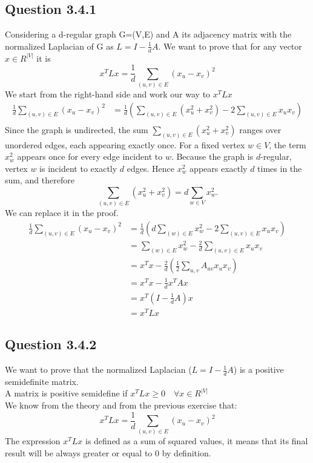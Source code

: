 \documentclass[a4paper]{scrartcl}
\begin{document}
\subsection*{Question 3.4.1}
Considering a d-regular graph G=(V,E) and A its adjacency matrix with the normalized Laplacian of G as $L=I-\frac{1}{d}A$. We want to prove that for any vector $x \in R^{|V|}$ it is
\[ 
x^T L x = \frac{1}{d}\sum_{(u,v)\in E} (x_u - x_v)^2
\]
We start from the right-hand side and work our way to $x^T L x$
\begin{align*}
  \frac{1}{d}\sum_{(u,v)\in E} (x_u - x_v)^2 &= \frac{1}{d} \left( \sum_{(u,v)\in E} \left(x_u^2 + x_v^2\right) - 2\sum_{(u,v)\in E} x_u x_v \right)\\
\end{align*}
Since the graph is undirected, the sum $\sum_{(u,v)\in E} \left(x_u^2 + x_v^2\right)$ ranges over unordered edges, each appearing exactly once.
For a fixed vertex $w\in V$, the term $x_w^2$ appears once for every edge incident to $w$.
Because the graph is $d$-regular, vertex $w$ is incident to exactly $d$ edges.
Hence $x_w^2$ appears exactly $d$ times in the sum, and therefore
\[
\sum_{(u,v)\in E} (x_u^2 + x_v^2)
= d \sum_{w\in V} x_w^2.
\]
We can replace it in the proof.
\begin{align*}
  \frac{1}{d}\sum_{(u,v)\in E} (x_u - x_v)^2 &= \frac{1}{d} \left( d\sum_{(w)\in E} x_w^2 - 2\sum_{(u,v)\in E} x_u x_v \right)\\
  &= \sum_{(w)\in E} x_w^2 - \frac{2}{d}\sum_{(u,v)\in E} x_u x_v\\
  &= x^T x - \frac{2}{d} \left(\frac{1}{2} \sum_{u,v} A_{uv} x_u x_v\right)\\
  &= x^T x - \frac{1}{d} x^T A x\\
  &= x^T \left(I -\frac{1}{d} A \right)x\\
  &= x^T L x
\end{align*}

\subsection*{Question 3.4.2}
We want to prove that the normalized Laplacian ($L=I-\frac{1}{d}A$) is a positive semidefinite matrix.\\
A matrix is positive semidefine if $x^TLx \geq 0 \quad \forall x \in R^{|V|}$\\
We know from the theory and from the previous exercise that:
\[
x^T L x = \frac{1}{d}\sum_{(u,v) \in E} (x_u - x_v)^2
\]
The expression $x^TLx$ is defined as a sum of squared values, it means that its final result will be always greater or equal to 0 by definition.
\end{document}
